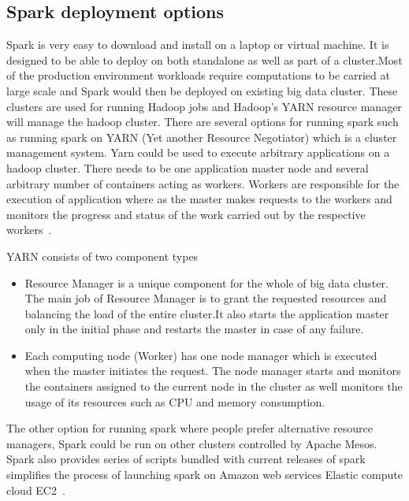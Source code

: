 \subsection{Spark deployment options}
Spark is very easy to download and install on a laptop or virtual machine. 
It is designed to be able to deploy on both standalone as well as part of a 
cluster.Most of the production environment workloads require computations to 
be carried at large scale and Spark would then be deployed on existing big data 
cluster. These clusters are used for running Hadoop jobs and Hadoop's YARN 
resource manager will manage the hadoop cluster. There are several options for 
running  spark such as running spark on YARN (Yet another Resource Negotiator) 
which is a cluster management system.
Yarn could be used to execute arbitrary applications on a hadoop cluster. 
There needs to be one application master node and several arbitrary number of 
containers acting as workers. Workers are responsible for the execution of 
application where as the master makes requests to the workers and monitors the 
progress and status of the work carried out by the respective workers~\cite{hid-sp18-410-spark-architecture}.

YARN consists of two component types

\begin{itemize}

\item Resource Manager is a unique component for the whole of big data cluster. The 
main job of Resource Manager is to grant the requested resources and balancing 
the load of the entire cluster.It also starts the application master only in 
the initial phase and restarts the master in case of any failure.

\item Each computing node (Worker) has one node manager  which is executed when the 
master initiates the request. The node manager starts and monitors the 
containers assigned to the current node in the cluster as well monitors the 
usage of its resources such as CPU and memory consumption.

\end{itemize}

The other option for running spark where people prefer alternative resource 
managers, Spark could be run on other clusters controlled by Apache Mesos.
Spark also provides series of scripts bundled with current releases of spark 
simplifies the process of launching spark on Amazon web services Elastic 
compute cloud EC2~\cite{hid-sp18-410-spark-architecture}.

